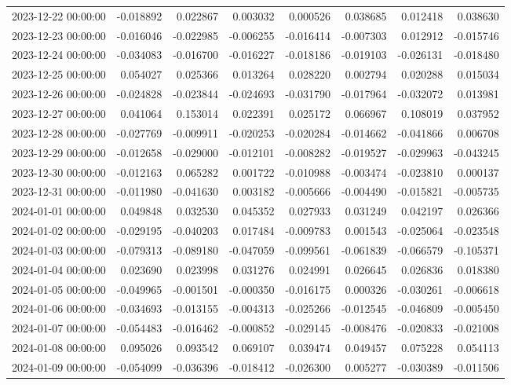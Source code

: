 \begin{tabular}{lrrrrrrr}
2023-12-22 00:00:00 & -0.018892 & 0.022867 & 0.003032 & 0.000526 & 0.038685 & 0.012418 & 0.038630 \\
2023-12-23 00:00:00 & -0.016046 & -0.022985 & -0.006255 & -0.016414 & -0.007303 & 0.012912 & -0.015746 \\
2023-12-24 00:00:00 & -0.034083 & -0.016700 & -0.016227 & -0.018186 & -0.019103 & -0.026131 & -0.018480 \\
2023-12-25 00:00:00 & 0.054027 & 0.025366 & 0.013264 & 0.028220 & 0.002794 & 0.020288 & 0.015034 \\
2023-12-26 00:00:00 & -0.024828 & -0.023844 & -0.024693 & -0.031790 & -0.017964 & -0.032072 & 0.013981 \\
2023-12-27 00:00:00 & 0.041064 & 0.153014 & 0.022391 & 0.025172 & 0.066967 & 0.108019 & 0.037952 \\
2023-12-28 00:00:00 & -0.027769 & -0.009911 & -0.020253 & -0.020284 & -0.014662 & -0.041866 & 0.006708 \\
2023-12-29 00:00:00 & -0.012658 & -0.029000 & -0.012101 & -0.008282 & -0.019527 & -0.029963 & -0.043245 \\
2023-12-30 00:00:00 & -0.012163 & 0.065282 & 0.001722 & -0.010988 & -0.003474 & -0.023810 & 0.000137 \\
2023-12-31 00:00:00 & -0.011980 & -0.041630 & 0.003182 & -0.005666 & -0.004490 & -0.015821 & -0.005735 \\
2024-01-01 00:00:00 & 0.049848 & 0.032530 & 0.045352 & 0.027933 & 0.031249 & 0.042197 & 0.026366 \\
2024-01-02 00:00:00 & -0.029195 & -0.040203 & 0.017484 & -0.009783 & 0.001543 & -0.025064 & -0.023548 \\
2024-01-03 00:00:00 & -0.079313 & -0.089180 & -0.047059 & -0.099561 & -0.061839 & -0.066579 & -0.105371 \\
2024-01-04 00:00:00 & 0.023690 & 0.023998 & 0.031276 & 0.024991 & 0.026645 & 0.026836 & 0.018380 \\
2024-01-05 00:00:00 & -0.049965 & -0.001501 & -0.000350 & -0.016175 & 0.000326 & -0.030261 & -0.006618 \\
2024-01-06 00:00:00 & -0.034693 & -0.013155 & -0.004313 & -0.025266 & -0.012545 & -0.046809 & -0.005450 \\
2024-01-07 00:00:00 & -0.054483 & -0.016462 & -0.000852 & -0.029145 & -0.008476 & -0.020833 & -0.021008 \\
2024-01-08 00:00:00 & 0.095026 & 0.093542 & 0.069107 & 0.039474 & 0.049457 & 0.075228 & 0.054113 \\
2024-01-09 00:00:00 & -0.054099 & -0.036396 & -0.018412 & -0.026300 & 0.005277 & -0.030389 & -0.011506 \\

\end{tabular}
